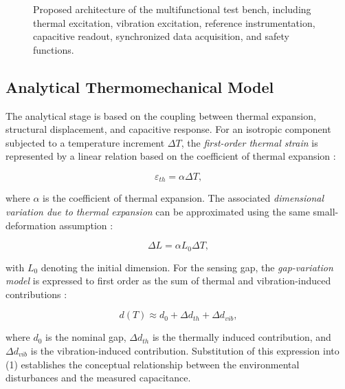 \documentclass[conference]{IEEEtran}
\begin{document}

\begin{figure}[t]
\centering
{}
\caption{Proposed architecture of the multifunctional test bench, including thermal excitation, vibration excitation, reference instrumentation, capacitive readout, synchronized data acquisition, and safety functions.}
\label{fig:bench_architecture}
\end{figure}

\subsection{Analytical Thermomechanical Model}

The analytical stage is based on the coupling between thermal expansion, structural displacement, and capacitive response. For an isotropic component subjected to a temperature increment $\Delta T$, the \textit{first-order thermal strain} is represented by a linear relation based on the coefficient of thermal expansion \cite{Hao2012}:

\begin{equation}
\varepsilon_{th}=\alpha\Delta T,
\label{eq:thermal_strain}
\end{equation}

where $\alpha$ is the coefficient of thermal expansion. The associated \textit{dimensional variation due to thermal expansion} can be approximated using the same small-deformation assumption \cite{Hao2012}:

\begin{equation}
\Delta L=\alpha L_0\Delta T,
\label{eq:thermal_length}
\end{equation}

with $L_0$ denoting the initial dimension. For the sensing gap, the \textit{gap-variation model} is expressed to first order as the sum of thermal and vibration-induced contributions \cite{Hao2012,Zhang2024}:

\begin{equation}
 d(T)\approx d_0+\Delta d_{th}+\Delta d_{vib},
\label{eq:gap}
\end{equation}

where $d_0$ is the nominal gap, $\Delta d_{th}$ is the thermally induced contribution, and $\Delta d_{vib}$ is the vibration-induced contribution. Substitution of this expression into (1) establishes the conceptual relationship between the environmental disturbances and the measured capacitance.
\end{document}
